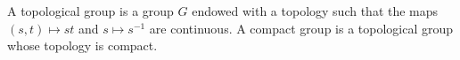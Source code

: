 A topological group is a group $G$ endowed with a topology such that the maps $(s,t) \mapsto st$ and $s \mapsto s^{-1}$ are continuous.
A compact group is a topological group whose topology is compact.
